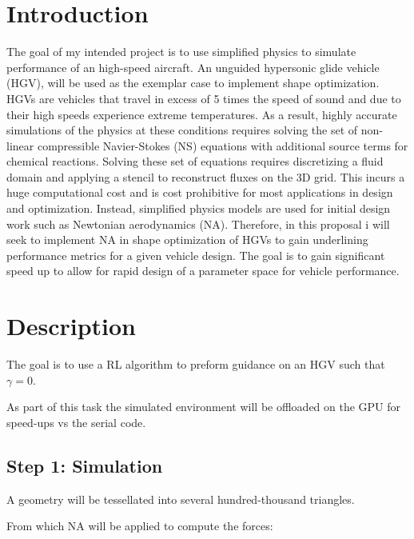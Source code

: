 \documentclass[12pt]{report} %
\begin{document}
\section*{Introduction}
The goal of my intended project is to use simplified physics to simulate performance of an high-speed aircraft. An unguided hypersonic glide vehicle (HGV), will be used as the exemplar case to implement
shape optimization. HGVs are vehicles that travel in excess of 5 times the speed of sound and due to their high speeds experience extreme temperatures. As a result, highly accurate simulations 
of the physics at these conditions requires solving the set of non-linear compressible Navier-Stokes (NS) equations with additional source terms for chemical reactions. Solving these set of equations requires
discretizing a fluid domain and applying a stencil to reconstruct fluxes on the 3D grid. This incurs a huge computational cost and is cost prohibitive for most applications in design and optimization. Instead,
simplified physics models are used for initial design work such as Newtonian aerodynamics (NA). Therefore, in this proposal i will seek to implement NA in shape optimization of HGVs to gain underlining 
performance metrics for a given vehicle design. The goal is to gain significant speed up to allow for rapid design of a parameter space for vehicle performance. 

\section*{Description}
The goal is to use a RL algorithm to preform guidance on an HGV such that $\gamma =0$.

As part of this task the simulated environment will be offloaded on the GPU for speed-ups vs the serial code. 


\subsection*{Step 1: Simulation}
A geometry will be tessellated into several hundred-thousand triangles. 

From which NA will be applied to compute the forces:
\end{document}
